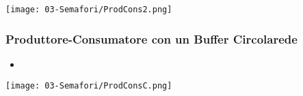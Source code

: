 \begin{center}
   \texttt{[image: 03-Semafori/ProdCons2.png]}
\end{center}

\subsubsection{Produttore-Consumatore con un Buffer Circolarede}

\begin{itemize}
  \item
\end{itemize}

\begin{center}
   \texttt{[image: 03-Semafori/ProdConsC.png]}
\end{center}








